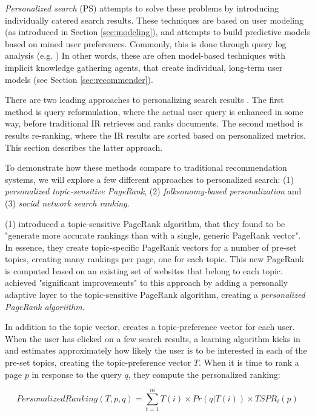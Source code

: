 \emph{Personalized search} (PS) attempts to solve these problems by introducing individually catered search results. 
These techniques are based on user modeling (as introduced in Section \ref{sec:modeling}),
and attempts to build predictive models based on mined user preferences.
Commonly, this is done through query log analysis (e.g. \cite{Liu2002, Sugiyama2004, Shen2005, Speretta2000})
In other words, these are often model-based techniques with implicit knowledge gathering agents,
that create individual, long-term user models (see Section \ref{sec:recommender}).

There are two leading approaches to personalizing search results \cite[p2]{Noll2007}. 
The first method is query reformulation, where the actual user query is enhanced in some way, before traditional IR 
retrieves and ranks documents. The second method is results re-ranking, where the IR results are sorted
based on personalized metrics. This section describes the latter approach.

To demonstrate how these methods compare to traditional recommendation systems,
we will explore a few different approaches to personalized search: 
(1) \emph{personalized topic-sensitive PageRank},
(2) \emph{folksonomy-based personalization} and
(3) \emph{social network search ranking}.

(1) \citet{Haveliwala2003} introduced a topic-sensitive PageRank algorithm, that they found
to be "generate more accurate rankings than with a single, generic PageRank vector". 
In essence, they create topic-specific PageRank vectors for a number of pre-set topics,
creating many rankings per page, one for each topic.
This new PageRank is computed based on an existing set of websites that belong to each topic.
\citet{Qiu2006} achieved "significant improvements" to this approach by adding a personally adaptive layer
to the topic-sensitive PageRank algorithm, creating a \emph{personalized PageRank algoriithm}. 

In addition to the topic vector, \citeauthor{Qiu2006}
creates a topic-preference vector for each user. When the user has clicked on a few search results,
a learning algorithm kicks in and estimates approximately how likely the user is to be interested 
in each of the pre-set topics, creating the topic-preference vector $T$. When it is time to rank a 
page $p$ in response to the query $q$, they compute the personalized ranking:

\begin{equation*}
  PersonalizedRanking(T,p,q) = \sum_{t=1}^{m} T(i) \times Pr(q|T(i)) \times TSPR_i(p)
\end{equation*}

